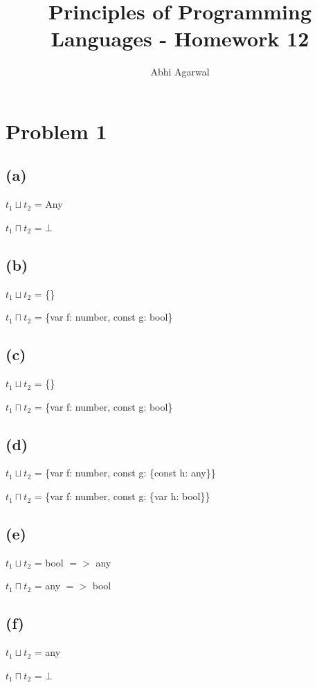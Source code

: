 \documentclass[11pt, oneside]{article}
\title{Principles of Programming Languages - Homework 12}
\author{Abhi Agarwal}
\date{}
\begin{document}
\maketitle
\section{Problem 1}
\subsection*{(a)} 
\indent \par $t_1 \sqcup t_2$ = Any
\par $t_1 \sqcap t_2$ = $\bot$

\subsection*{(b)}
\indent \par $t_1 \sqcup t_2$ = \{\}
\par $t_1 \sqcap t_2$ = \{var f: number, const g: bool\}

\subsection*{(c)}
\indent \par $t_1 \sqcup t_2$ = \{\}
\par $t_1 \sqcap t_2$ = \{var f: number, const g: bool\}

\subsection*{(d)}
\indent \par $t_1 \sqcup t_2$ = \{var f: number, const g: \{const h: any\}\}
\par $t_1 \sqcap t_2$ = \{var f: number, const g: \{var h: bool\}\}

\subsection*{(e)}
\indent \par $t_1 \sqcup t_2$ = bool $=>$ any
\par $t_1 \sqcap t_2$ = any $=>$ bool

\subsection*{(f)}
\indent \par $t_1 \sqcup t_2$ = any
\par $t_1 \sqcap t_2$ =  $\bot$ %
\end{document}
